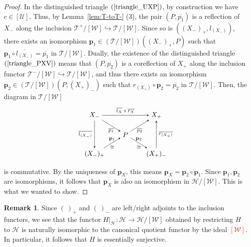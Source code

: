 \documentclass[a4paper,reqno,10pt]{amsart}
\theoremstyle{definition}
\theoremstyle{definition}
\newtheorem{remark}[remark]{Remark}
\theoremstyle{definition}
\theoremstyle{definition}
\theoremstyle{plain}
\newcommand{\CH}{\mathcal{H}}
\newcommand{\CT}{\mathcal{T}}
\newcommand{\CU}{\mathcal{U}}
\newcommand{\CW}{\mathcal{W}}
\begin{document}
\begin{proof}
In the distinguished triangle $(\ref{triangle_UXP})$, by construction we have $c\in [\CU]$. Thus, by Lemma~\ref{lem:T-toT-} {\rm (3)}, the pair $(P,\overline{p_1})$ is a reflection of $X_-$ along the inclusion $\CT^+/[\CW]\hookrightarrow\CT/[\CW]$. Since so is $((X_-)_+,\overline{l_{(X_-)}})$, there exists an isomorphism $\mathbf{p}_1\in(\CT/[\CW])((X_-)_+,P)$ such that $\mathbf{p}_1\circ\overline{l_{(X_-)}}=\overline{p_1}$ in $\CT/[\CW]$. Dually, the existence of the distinguished triangle $(\ref{triangle_PXV})$ means that $(P,\overline{p_2})$ is a coreflection of $X_+$ along the inclusion functor $\CT^-/[\CW]\hookrightarrow\CT/[\CW]$, and thus there exists an isomorphism $\mathbf{p}_2\in(\CT/[\CW])(P,(X_+)_-)$ such that $\overline{r_{(X_+)}}\circ\mathbf{p}_2=\overline{p_2}$ in $\CT/[\CW]$.
Then, the diagram in $\CT/[\CW]$
\[
\begin{tikzpicture}[>=stealth]
\node (1) at (-1.6,1) {$X_-$};
\node (2) at (1.6,1) {$X_+$};
\node (3) at (-1.6,-1) {$(X_-)_+$};
\node (4) at (1.6,-1) {$(X_+)_-$};
\node (5) at (0,0) {$P$};
\draw[->] (1) -- node[above,font=\scriptsize] {$\overline{l_X}\circ\overline{r_X}$} (2);
\draw[->] (1) -- node[left,font=\scriptsize] {$\overline{l_{(X_-)}}$} (3);
\draw[->] (4) -- node[right,font=\scriptsize] {$\overline{r_{(X_+)}}$} (2);
\draw[->] (1) -- node[below,font=\scriptsize] {$\overline{p_1}$} (5);
\draw[->] (5) -- node[below,font=\scriptsize] {$\overline{p_2}$} (2);
\draw[->] (3) -- node[above,font=\scriptsize] {$\mathbf{p}_1$} node[below,font=\scriptsize] {$\cong$} (5);
\draw[->] (5) -- node[above,font=\scriptsize] {$\mathbf{p}_2$} node[below,font=\scriptsize] {$\cong$} (4);
\end{tikzpicture}
\]
is commutative. By the uniqueness of $\mathbf{p}_X$, this means $\mathbf{p}_X=\mathbf{p}_2\circ\mathbf{p}_1$. Since $\mathbf{p}_1,\mathbf{p}_2$ are isomorphisms, it follows that $\mathbf{p}_X$ is also an isomorphism in $\CH/[\CW]$. This is what we wanted to show.
\end{proof}

\begin{remark}\label{rem:essentially_surjective_H}
Since $(\ )_+$ and $(\ )_-$ are left/right adjoints to the inclusion functors, we see that the functor $H|_{\CH}\colon\CH\to\CH/[\CW]$ obtained by restricting $H$ to $\CH$ is naturally isomorphic to the canonical quotient functor by the ideal \textcolor{red}{$[\CW]$}. In particular, it follows that $H$ is essentially surjective.
\end{remark}
\end{document}

